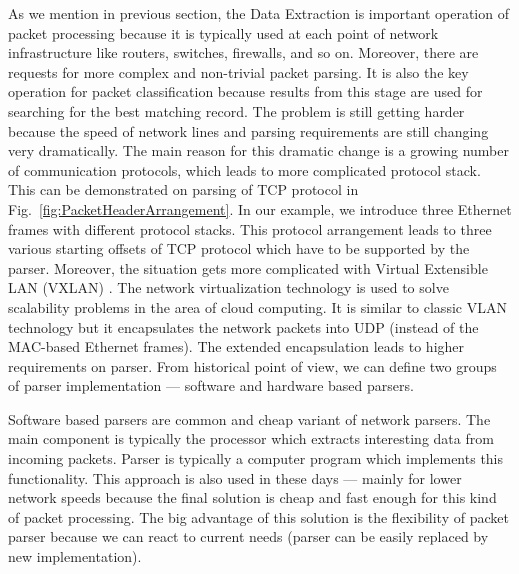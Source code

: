 As we mention in previous section, the Data Extraction is important operation of packet processing because it is typically used at each
point of network infrastructure like routers, switches, firewalls, and so on. 
Moreover, there are requests for more complex and non-trivial packet parsing. It is also the key operation for packet classification 
because results from this stage are used for searching for the best matching record.
The problem is still getting harder because the speed of network lines and parsing requirements
are still changing very dramatically. 
The main reason for this dramatic change is a growing number of communication protocols, which leads to more complicated protocol stack. 
This can be demonstrated on parsing of TCP protocol \cite{RFCTRANS} in Fig.~\ref{fig:PacketHeaderArrangement}. 
In our example, we introduce three Ethernet frames with different protocol stacks. 
This protocol arrangement leads to three various starting offsets of TCP protocol which have to be supported by the parser.
Moreover, the situation gets more complicated with Virtual Extensible LAN (VXLAN) \cite{RFCVXLAN}. 
The network virtualization technology is used to solve scalability problems in the area of cloud computing. 
It is similar to classic VLAN technology \cite{ieee2003vlan} but it encapsulates the network packets into UDP (instead of the MAC-based Ethernet frames).
The extended encapsulation leads to higher requirements on parser. 
From historical point of view, we can define two groups of parser implementation --- software and hardware based parsers.

Software based parsers are common and cheap variant of network parsers. The main component is typically the processor which 
extracts interesting data from incoming packets. 
Parser is typically a computer program which implements this functionality. This approach is also used in these days --- mainly for lower network 
speeds because the final solution is cheap and fast enough for this kind of packet processing. 
The big advantage of this solution is the flexibility of packet parser because we can react to current needs 
(parser can be easily replaced by new implementation).

